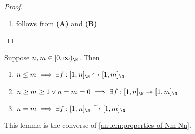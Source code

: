 \begin{proof}
\begin{enumerate}[label=\textbf{(\Alph*)}]
\begin{itemize}
\begin{itemize}
\[\begin{array}{c}
                              n - 1 \geq m                                                       \\
                              \Downarrow                                                         \\
                              n \geq m + 1 \geq 1                                                \\
                            \end{array}
                          \]
                  \end{itemize}
                  Therefore, $Q(m + 1)$ is true.
          \end{itemize}
          By \cref{an:thm:mathematical-induction},
          \[
            \forall m \in [0, \infty)_{\N}, Q(m) \text{ is true}
          \]
    \item follows from \textbf{(A)} and \textbf{(B)}.
  \end{enumerate}
\end{proof}

\bigskip

\begin{lemma} \label{an:lem:properties-of-Nm-Nn-converse}
  Suppose $n, m \in [0, \infty)_{\N}$. Then
  \begin{enumerate}[label=\textbf{(\Alph*)}]
    \item $n \leq m \implies \exists f: [1, n]_{\N} \hookrightarrow [1, m]_{\N}$
    \item $n \geq m \geq 1 \lor n = m = 0 \implies \exists f: [1, n]_{\N} \twoheadrightarrow [1, m]_{\N}$
    \item $n = m \implies \exists f: [1, n]_{\N} \xrightarrow{\sim} [1, m]_{\N}$
  \end{enumerate}
  This lemma is the converse of \cref{an:lem:properties-of-Nm-Nn}.
\end{lemma}
